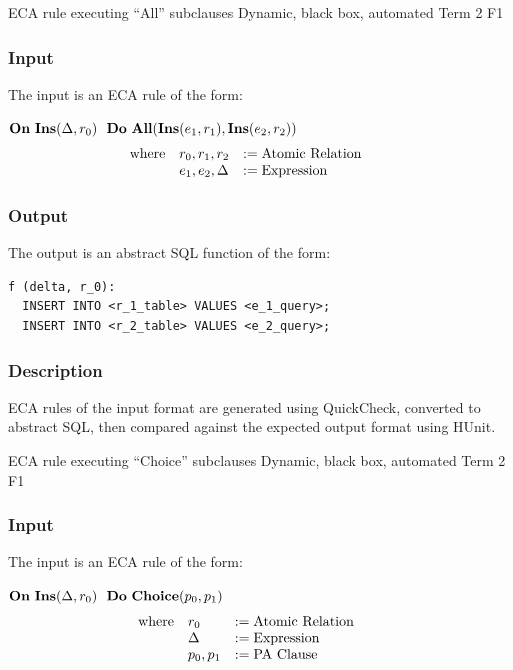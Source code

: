 \documentclass[12pt]{report}
\begin{document}
{ECA rule executing ``All'' subclauses}  %
{Dynamic, black box, automated}  
{Term 2}
{F1}
\vspace{-12pt}\subsubsection*{Input}
The input is an ECA rule of the form:

$\mathbf{On~} \mathbf{Ins}(\Delta,r_0) \,\,\,\,\mathbf{Do~} \mathbf{All} ( \mathbf{Ins}(e_1,r_1), \mathbf{Ins}(e_2,r_2) )$
\vspace{-10pt}\[\hspace{-20pt}\begin{array}{lll}
\text{where} & r_0, r_1, r_2    & := \text{Atomic Relation} \\ 
             & e_1, e_2, \Delta & := \text{Expression} \\ 
\end{array}\]

\vspace{-12pt}\subsubsection*{Output}

The output is an abstract SQL function of the form:
\begin{verbatim}
f (delta, r_0):
  INSERT INTO <r_1_table> VALUES <e_1_query>;
  INSERT INTO <r_2_table> VALUES <e_2_query>;
\end{verbatim}

\vspace{-12pt}\subsubsection*{Description}

ECA rules of the input format are generated using QuickCheck, converted to
  abstract SQL, then compared against the expected output format using HUnit.

{ECA rule executing ``Choice'' subclauses}  %
{Dynamic, black box, automated}  
{Term 2}
{F1}
\vspace{-12pt}\subsubsection*{Input}
The input is an ECA rule of the form:

$\mathbf{On~} \mathbf{Ins}(\Delta,r_0) \,\,\,\,\mathbf{Do~} \mathbf{Choice} ( p_0, p_1 )$
\vspace{-10pt}\[\hspace{-20pt}\begin{array}{lll}
\text{where} & r_0   & := \text{Atomic Relation} \\ 
             & \Delta & := \text{Expression} \\ 
             & p_0, p_1 & := \text{PA Clause} \\
\end{array}\]
\end{document}

